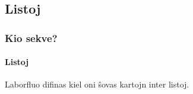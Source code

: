 \subsection{Listoj}

  \begin{frame}
    \frametitle{Kio sekve?}
    \framesubtitle{Listoj}

	\begin{block}
	
		\begin{center}
		\alert{Laborfluo} difinas kiel oni ŝovas \alert{kartojn} inter \alert{listoj}.
		\end{center}

	\end{block}
		
	
  \end{frame}


